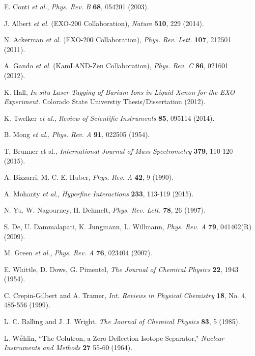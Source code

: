 \documentclass[PhD, copyrightpage]{csuthesis} %
\begin{document}
\begin{thebibliography}{00}
  E. Conti \emph{et al.}, \emph{Phys. Rev. B} \textbf{68}, 054201 (2003).
 
  J. Albert \emph{et al.} (EXO-200 Collaboration), \emph{Nature} \textbf{510}, 229 (2014).
 
  N. Ackerman \emph{et al.} (EXO-200 Collaboration), \emph{Phys. Rev. Lett.} \textbf{107}, 212501 (2011).
 
  A. Gando \emph{et al.} (KamLAND-Zen Collaboration), \emph{Phys. Rev. C} \textbf{86}, 021601 (2012).
 
  K. Hall, \emph{In-situ Laser Tagging of Barium Ions in Liquid Xenon for the EXO Experiment.}  Colorado State Universtiy Thesis/Dissertation (2012).
 
  K. Twelker \emph{et al.}, \emph{Review of Scientific Instruments} \textbf{85}, 095114 (2014).
 
  B. Mong \emph{et al.}, \emph{Phys. Rev. A} \textbf{91}, 022505 (1954).
 
  T. Brunner \emph et al., \emph{International Journal of Mass Spectrometry} \textbf{379}, 110-120 (2015).
 
 
  A. Bizzarri, M. C. E. Huber, \emph{Phys. Rev. A} \textbf{42}, 9 (1990).
 
  A. Mohanty \emph{et al.}, \emph{Hyperfine Interactions} \textbf{233}, 113-119 (2015).
 
  N. Yu, W. Nagourney, H. Dehmelt, \emph{Phys. Rev. Lett.} \textbf{78}, 26 (1997).
 
  S. De, U. Dammalapati, K. Jungmann, L. Willmann, \emph{Phys. Rev. A} \textbf{79}, 041402(R) (2009).
 
  M. Green \emph{et al.}, \emph{Phys. Rev. A} \textbf{76}, 023404 (2007).
 
  E. Whittle, D. Dows, G. Pimentel, \emph{The Journal of Chemical Physics} \textbf{22}, 1943 (1954).
 
  C. Crepin-Gilbert and A. Tramer, \emph{Int. Reviews in Physical Chemistry} \textbf{18}, No. 4, 485-556 (1999).
 
  L. C. Balling and J. J. Wright, \emph{The Journal of Chemical Physics} \textbf{83}, 5 (1985).
 
  L. W$\overset{\circ}{a}$hlin, ``The Colutron, a Zero Deflection Isotope Separator," \emph{Nuclear Instruments and Methods} \textbf{27} 55-60 (1964).
 

\end{thebibliography}
\end{document}
